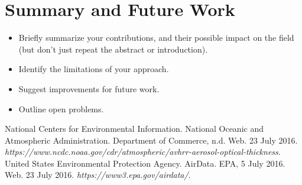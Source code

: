 \documentclass[10pt]{article}
\begin{document}
\section{Summary and Future Work}
\begin{itemize}
\item Briefly summarize your contributions, and their possible
impact on the field (but don't just repeat the abstract or introduction).
\item Identify the limitations of your approach.
\item Suggest improvements for future work.
\item Outline open problems.
\end{itemize}

\begin{thebibliography}{99}

 National Centers for Environmental Information. National Oceanic and Atmospheric Administration. Department of Commerce, n.d. Web. 23 July 2016. \textit{https://www.ncdc.noaa.gov/cdr/atmospheric/avhrr-aerosol-optical-thickness}.
 United States Environmental Protection Agency. AirData. EPA, 5 July 2016. Web. 23 July 2016. \textit{https://www3.epa.gov/airdata/}.


\end{thebibliography}
\end{document}
